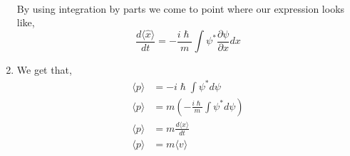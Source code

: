 \documentclass[addpoints]{exam}
\theoremstyle{mytheoremstyle}
\theoremstyle{mytheoremstyle}
\theoremstyle{myproblemstyle}
\begin{document}
\begin{questions}
\begin{solution}
\begin{enumerate}
\begin{equation*}
\begin{aligned}
				      \end{aligned}
			      \end{equation*}
			      By using integration by parts we come to point where our expression looks like\cite{DavidJ.Griffiths:2005:IntroductiontoQuantumMechanics},
			      \[\frac{d\langle\hat{x}\rangle}{dt} = -\frac{i\hslash}{m}\int \psi^{*}\frac{\partial\psi}{\partial x}dx \]
			\item We get that,
			      \begin{equation*}
				      \begin{aligned}
					      \langle p\rangle & = -i\hslash\int \psi^{*} d\psi                         \\
					      \langle p\rangle & = m\left(-\frac{i\hslash}{m}\int \psi^{*} d\psi\right) \\
					      \langle p\rangle & = m\frac{d\langle x\rangle}{dt}                        \\
					      \langle p\rangle & = m\langle v\rangle
				      \end{aligned}
			      \end{equation*}

			      \newpage


\end{enumerate}
\end{solution}
\end{questions}
\end{document}
